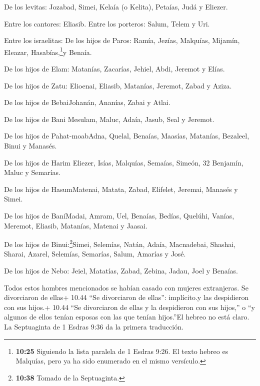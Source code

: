  De los levitas: Jozabad, Simei, Kelaía (o Kelita),
Petaías, Judá y Eliezer.

 Entre los cantores: Eliasib. Entre los porteros: Salum,
Telem y Uri.

 Entre los israelitas: De los hijos de Paros: Ramía,
Jezías, Malquías, Mijamín, Eleazar, Hasabías,\footnote{\textbf{10:25}
  Siguiendo la lista paralela de 1 Esdras 9:26. El texto hebreo es
  Malquías, pero ya ha sido enumerado en el mismo versículo.}y Benaía.

 De los hijos de Elam: Matanías, Zacarías, Jehiel, Abdi,
Jeremot y Elías.

 De los hijos de Zatu: Elioenai, Eliasib, Matanías,
Jeremot, Zabad y Aziza.

 De los hijos de BebaiJohanán, Ananías, Zabai y Atlai.

 De los hijos de Bani Mesulam, Maluc, Adaía, Jasub, Seal y
Jeremot.

 De los hijos de Pahat-moabAdna, Quelal, Benaías, Maasías,
Matanías, Bezaleel, Binui y Manasés.

 De los hijos de Harim Eliezer, Isías, Malquías, Semaías,
Simeón, 32 Benjamín, Maluc y Semarías.

 De los hijos de HasumMatenai, Matata, Zabad, Elifelet,
Jeremai, Manasés y Simei.

 De los hijos de BaníMadai, Amram, Uel, 
Benaías, Bedías, Quelúhi,  Vanías, Meremot, Eliasib,
 Matanías, Matenai y Jaasai.

 De los hijos de Binui:\footnote{\textbf{10:38} Tomado de
  la Septuaginta.}Simei,  Selemías, Natán, Adaía,
 Macnadebai, Shashai, Sharai,  Azarel,
Selemías, Semarías,  Salum, Amarías y José.

 De los hijos de Nebo: Jeiel, Matatías, Zabad, Zebina,
Jadau, Joel y Benaías.

 Todos estos hombres mencionados se habían casado con
mujeres extranjeras. Se divorciaron de ellas+ 10.44 ``Se divorciaron de
ellas'': implícito.y las despidieron con sus hijos.+ 10.44 ``Se
divorciaron de ellas y la despidieron con sus hijos,'' o ``y algunos de
ellos tenían esposas con las que tenían hijos.''El hebreo no está claro.
La Septuaginta de 1 Esdras 9:36 da la primera traducción.
